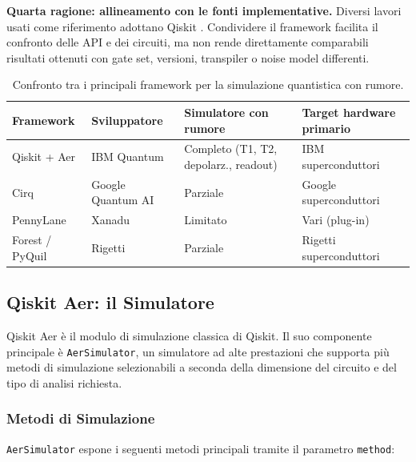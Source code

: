 \begin{onehalfspace}
\textbf{Quarta ragione: allineamento con le fonti implementative.} Diversi lavori usati come riferimento adottano Qiskit \cite{skosana2021, shor_hpec2023, ml_mitigation2023}. Condividere il framework facilita il confronto delle API e dei circuiti, ma non rende direttamente comparabili risultati ottenuti con gate set, versioni, transpiler o noise model differenti.

\begin{table}[H]
\centering
\caption{Confronto tra i principali framework per la simulazione quantistica con rumore.}
\label{tab:framework_confronto}
\begin{tabularx}{\textwidth}{lXXX}
\toprule
\textbf{Framework} & \textbf{Sviluppatore} & \textbf{Simulatore con rumore} & \textbf{Target hardware primario} \\
\midrule
Qiskit + Aer        & IBM Quantum           & Completo (T1, T2, depolarz., readout) & IBM superconduttori \\
Cirq                & Google Quantum AI     & Parziale                               & Google superconduttori \\
PennyLane           & Xanadu                & Limitato                               & Vari (plug-in) \\
Forest / PyQuil     & Rigetti               & Parziale                               & Rigetti superconduttori \\
\bottomrule
\end{tabularx}
\end{table}

\subsection{Qiskit Aer: il Simulatore}
\label{sec:qiskit_aer}

Qiskit Aer è il modulo di simulazione classica di Qiskit. Il suo componente principale è \texttt{AerSimulator}, un simulatore ad alte prestazioni che supporta più metodi di simulazione selezionabili a seconda della dimensione del circuito e del tipo di analisi richiesta.

\subsubsection{Metodi di Simulazione}

\texttt{AerSimulator} espone i seguenti metodi principali tramite il parametro \texttt{method}:


\end{onehalfspace}
